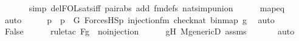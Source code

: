 \begin{isabellebody}
\ \ \ \ \ \isamarkupfalse%
\ {\isacharparenleft}{\kern0pt}simp\ del{\isacharcolon}{\kern0pt}FOL{\isacharunderscore}{\kern0pt}sats{\isacharunderscore}{\kern0pt}iff\ pair{\isacharunderscore}{\kern0pt}abs\ add{\isacharcolon}{\kern0pt}\ fm{\isacharunderscore}{\kern0pt}defs\ nat{\isacharunderscore}{\kern0pt}simp{\isacharunderscore}{\kern0pt}union{\isacharparenright}{\kern0pt}\isanewline
\ \ \ \ \isamarkupfalse%
\ mapeq\isanewline
\ \ \ \ \isamarkupfalse%
\ auto\isanewline
\ \ \isamarkupfalse%
\ \isamarkupfalse%
\ p\ \ {\isachardoublequoteopen}p\ {\isasymin}\ G{\isachardoublequoteclose}\ {\isachardoublequoteopen}ForcesHS{\isacharparenleft}{\kern0pt}p{\isacharcomma}{\kern0pt}\ injection{\isacharunderscore}{\kern0pt}fm{\isacharparenleft}{\kern0pt}{}{\isacharcomma}{\kern0pt}{}{\isacharcomma}{\kern0pt}{}{\isacharparenright}{\kern0pt}{\isacharcomma}{\kern0pt}\ {\isacharbrackleft}{\kern0pt}check{\isacharparenleft}{\kern0pt}nat{\isacharparenright}{\kern0pt}{\isacharcomma}{\kern0pt}\ binmap{\isacharprime}{\kern0pt}{\isacharcomma}{\kern0pt}\ g{\isacharprime}{\kern0pt}{\isacharbrackright}{\kern0pt}{\isacharparenright}{\kern0pt}{\isachardoublequoteclose}\ \isamarkupfalse%
\ auto\isanewline
\ \ \isamarkupfalse%
\ \isamarkupfalse%
\ False\ \isanewline
\ \ \ \ \isamarkupfalse%
{\isacharparenleft}{\kern0pt}rule{\isacharunderscore}{\kern0pt}tac\ F{\isacharprime}{\kern0pt}{\isacharequal}{\kern0pt}g{\isacharprime}{\kern0pt}\ \ no{\isacharunderscore}{\kern0pt}injection{\isacharparenright}{\kern0pt}\isanewline
\ \ \ \ \isamarkupfalse%
\ g{\isacharprime}{\kern0pt}H\ M{\isacharunderscore}{\kern0pt}genericD\ assms\ \isanewline
\ \ \ \ \isamarkupfalse%
\ auto\isanewline
{}\isamarkupfalse%
%
\endisatagproof
{\isafoldproof}%
%
\isadelimproof
\isanewline
%
\endisadelimproof
\isanewline
\isanewline
\isanewline
\isanewline
\ \ \isanewline
\isanewline
\isanewline
{}\isamarkupfalse%
\isanewline
%
\isadelimtheory
%
\endisadelimtheory
%
\isatagtheory
{}\isamarkupfalse%
%
\endisatagtheory
{\isafoldtheory}%
%
\isadelimtheory
%
\endisadelimtheory
%
\end{isabellebody}%
\endinput
